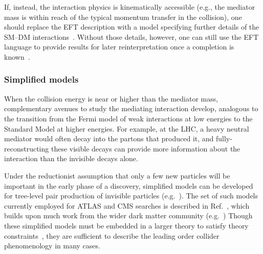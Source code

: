 
If, instead, the interaction physics is kinematically accessible (e.g., the mediator mass is within reach of the typical momentum transfer in the collision), one should replace the EFT description with a model specifying further details of the SM--DM interactions~\cite{Shoemaker:2011vi}.
Without those details, however, one can still use the EFT language to provide results for later reinterpretation once a completion is known~\cite{Racco:2015dxa,Busoni:2013lha}. 


\subsubsection{Simplified models}
\label{sub:simplifiedModels}

When the collision energy is near or higher than the mediator mass, complementary avenues to study the mediating interaction develop, analogous to the transition from the Fermi model of weak interactions at low energies to the Standard Model at higher energies.
For example, at the LHC, a heavy neutral \Zprime mediator would often decay into the partons that produced it, and fully-reconstructing these visible decays can provide more information about the interaction than the invisible decays alone. 

Under the reductionist assumption that only a few new particles will be important in the early phase of a discovery, simplified models can be developed for tree-level pair production of invisible particles (e.g.~\cite{Alwall:2008ag, Alves:2011wf}). 
The set of such models currently employed for ATLAS and CMS searches is described in Ref.~\cite{Abercrombie:2015wmb}, which builds upon much work from the wider dark matter community (e.g.~\cite{Fox:2011pm,Abdallah:2015ter}) 
Though these simplified models must be embedded in a larger theory to satisfy theory constraints~\cite{Kahlhoefer:2015bea}, they are sufficient to describe the leading order collider phenomenology in many cases.

